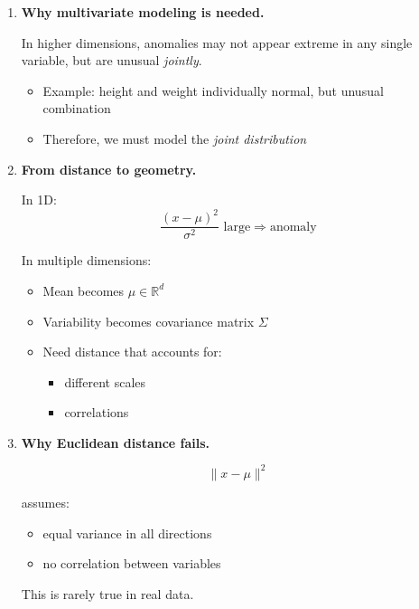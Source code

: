 \documentclass{article}
\begin{document}
\begin{enumerate}
\begin{itemize}
    \item Probability decreases as distance from \( \mu \) increases
    \item Distance is measured in units of standard deviation
    \item Z-score:
    \[
    z^2 = \frac{(x-\mu)^2}{\sigma^2}
    \]
\end{itemize}

\item \textbf{Why multivariate modeling is needed.}

In higher dimensions, anomalies may not appear extreme in any single variable, but are unusual \emph{jointly}.

\begin{itemize}
    \item Example: height and weight individually normal, but unusual combination
    \item Therefore, we must model the \emph{joint distribution}
\end{itemize}

\item \textbf{From distance to geometry.}

In 1D:
\[
\frac{(x-\mu)^2}{\sigma^2} \text{ large} \Rightarrow \text{anomaly}
\]

In multiple dimensions:
\begin{itemize}
    \item Mean becomes \( \mu \in \mathbb{R}^d \)
    \item Variability becomes covariance matrix \( \Sigma \)
    \item Need distance that accounts for:
    \begin{itemize}
        \item different scales
        \item correlations
    \end{itemize}
\end{itemize}

\item \textbf{Why Euclidean distance fails.}

\[
\|x - \mu\|^2
\]

assumes:
\begin{itemize}
    \item equal variance in all directions
    \item no correlation between variables
\end{itemize}

This is rarely true in real data.


\end{enumerate}
\end{document}
